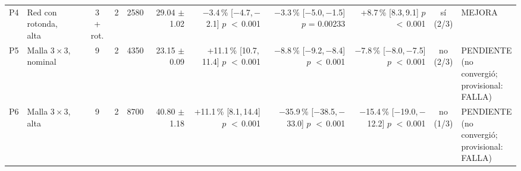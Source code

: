\begin{table}[H]
\begin{tabular}{llcrrrrrrcl}
P4 & \makecell[l]{Red con\\{}rotonda,\\{}alta} & \makecell[c]{3\\{}+ rot.} & 2 & 2580 & \makecell[r]{29.04\\{}$\pm$ 1.02} & \makecell[r]{$-$3.4\,\%\\{}[$-$4.7,\,$-$2.1]\\$p$ $<$\,0.001} & \makecell[r]{$-$3.3\,\%\\{}[$-$5.0,\,$-$1.5]\\$p$ = 0.00233} & \makecell[r]{+8.7\,\%\\{}[8.3,\,9.1]\\$p$ $<$\,0.001} & \makecell[c]{sí\\{}(2/3)} & MEJORA \\
P5 & \makecell[l]{Malla $3 \times 3$,\\{}nominal} & 9 & 2 & 4350 & \makecell[r]{23.15\\{}$\pm$ 0.09} & \makecell[r]{+11.1\,\%\\{}[10.7,\,11.4]\\$p$ $<$\,0.001} & \makecell[r]{$-$8.8\,\%\\{}[$-$9.2,\,$-$8.4]\\$p$ $<$\,0.001} & \makecell[r]{$-$7.8\,\%\\{}[$-$8.0,\,$-$7.5]\\$p$ $<$\,0.001} & \makecell[c]{no\\{}(2/3)} & \makecell[l]{PENDIENTE\\{}(no convergió;\\{}provisional:\\{}FALLA)} \\
P6 & \makecell[l]{Malla $3 \times 3$,\\{}alta} & 9 & 2 & 8700 & \makecell[r]{40.80\\{}$\pm$ 1.18} & \makecell[r]{+11.1\,\%\\{}[8.1,\,14.4]\\$p$ $<$\,0.001} & \makecell[r]{$-$35.9\,\%\\{}[$-$38.5,\,$-$33.0]\\$p$ $<$\,0.001} & \makecell[r]{$-$15.4\,\%\\{}[$-$19.0,\,$-$12.2]\\$p$ $<$\,0.001} & \makecell[c]{no\\{}(1/3)} & \makecell[l]{PENDIENTE\\{}(no convergió;\\{}provisional:\\{}FALLA)} \\

\end{tabular}
\end{table}
